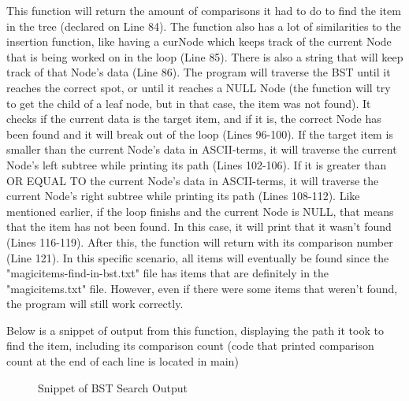 \documentclass[letterpaper, 10pt]{article}
\begin{document}
\vspace{-1em}
\noindent
This function will return the amount of comparisons it had to do to find the item in the tree (declared on Line 84). The function also has a lot of similarities to the insertion function, like having a curNode which keeps track of the current Node that is being worked on in the loop (Line 85). There is also a string that will keep track of that Node's data (Line 86). The program will traverse the BST until it reaches the correct spot, or until it reaches a NULL Node (the function will try to get the child of a leaf node, but in that case, the item was not found). It checks if the current data is the target item, and if it is, the correct Node has been found and it will break out of the loop (Lines 96-100). If the target item is smaller than the current Node's data in ASCII-terms, it will traverse the current Node's left subtree while printing its path (Lines 102-106). If it is greater than OR EQUAL TO the current Node's data in ASCII-terms, it will traverse the current Node's right subtree while printing its path (Lines 108-112). Like mentioned earlier, if the loop finishs and the current Node is NULL, that means that the item has not been found. In this case, it will print that it wasn't found (Lines 116-119). After this, the function will return with its comparison number (Line 121). In this specific scenario, all items will eventually be found since the "magicitems-find-in-bst.txt" file has items that are definitely in the "magicitems.txt" file. However, even if there were some items that weren't found, the program will still work correctly.

\vspace{0.5em}
\noindent
Below is a snippet of output from this function, displaying the path it took to find the item, including its comparison count (code that printed comparison count at the end of each line is located in main)

\begin{figure}[H] 
    \centering 
    \caption{Snippet of BST Search Output}
    \label{fig:figure3.11}
\end{figure}
\end{document}
